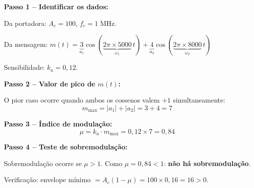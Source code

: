 \documentclass[11pt,a4paper]{article}
\begin{document}
\begin{resolucao}

\textbf{Passo 1 -- Identificar os dados:}

Da portadora: $A_c = 100$, $f_c = 1\;\text{MHz}$.

Da mensagem: $m(t) = \underbrace{3}_{a_1}\cos(\underbrace{2\pi \times 5000}_{{\omega_1}}\,t) + \underbrace{4}_{a_2}\cos(\underbrace{2\pi \times 8000}_{{\omega_2}}\,t)$

Sensibilidade: $k_a = 0{,}12$.

\textbf{Passo 2 -- Valor de pico de $m(t)$:}

O pior caso ocorre quando ambos os cossenos valem $+1$ simultaneamente:
\[
  m_{\max} = |a_1| + |a_2| = 3 + 4 = 7
\]

\textbf{Passo 3 -- Índice de modulação:}
\[
  \mu = k_a \cdot m_{\max} = 0{,}12 \times 7 = \boxed{0{,}84}
\]

\textbf{Passo 4 -- Teste de sobremodulação:}

Sobremodulação ocorre se $\mu > 1$. Como $\mu = 0{,}84 < 1$: \textbf{não há sobremodulação}.

Verificação: envelope mínimo $= A_c(1 - \mu) = 100 \times 0{,}16 = 16 > 0$. \checkmark
\end{resolucao}
\end{document}
